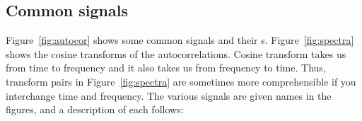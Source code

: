 \subsection{Common signals}
Figure~\ref{fig:autocor} shows some common signals and their
s.
Figure~\ref{fig:spectra} shows the cosine transforms of
the autocorrelations.
Cosine transform takes us from time to frequency and it also takes
us from frequency to time.
Thus, transform pairs in Figure~\ref{fig:spectra}
are sometimes more comprehensible
if you interchange time and frequency.
The various signals are given names in the figures,
and a description of each follows:
{}
